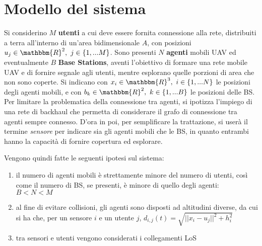\section{Modello del sistema} \label{sec:modello_sistema}
Si considerino $M$ \textbf{utenti} a cui deve essere fornita connessione alla rete, distribuiti a terra all'interno di un'area bidimensionale $A$, con posizioni $u_j \in \mathbbm{R}^2 ,\ j \in \{1, ...M \}$.
Sono presenti $N$ \textbf{agenti} mobili UAV ed eventualmente $B$ \textbf{Base Stations}, aventi l'obiettivo di formare una rete mobile UAV e di fornire segnale agli utenti, mentre esplorano quelle porzioni di area che non sono coperte.
Si indicano con $x_i \in \mathbbm{R}^3 ,\ i \in \{1, ...N \}$ le posizioni degli agenti mobili, e con $b_k \in \mathbbm{R}^2 ,\ k \in \{1, ...B\}$ le posizioni delle BS.
Per limitare la problematica della connessione tra agenti, si ipotizza l'impiego di una rete di backhaul che permetta di considerare il grafo di connessione tra agenti sempre connesso.
D'ora in poi, per semplificare la trattazione, si userà il termine \textit{sensore} per indicare sia gli agenti mobili che le BS, in quanto entrambi hanno la capacità di fornire copertura ed esplorare.

Vengono quindi fatte le seguenti ipotesi sul sistema:
\begin{enumerate}

\item
il numero di agenti mobili è strettamente minore del numero di utenti, così come il numero di BS, se presenti, è minore di quello degli agenti: $B<N<M$




\item
al fine di evitare collisioni, gli agenti sono disposti ad altitudini diverse, da cui si ha che, per un sensore $i$ e un utente $j$, $d_{i,j}(t)=\sqrt{||x_i - u_j ||^2 + h_i^2}$

\item
tra sensori e utenti vengono considerati i collegamenti LoS

\end{enumerate}
